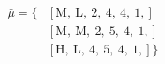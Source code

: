 \begin{equation}
\nonumber
\begin{aligned}
\bar{\mu} = \{  & \left[\text{M}, \ \text{L}, \ \text{2}, \ \text{4}, \ \text{4}, \ \text{1}, \right] \\  & \left[\text{M}, \ \text{M}, \ \text{2}, \ \text{5}, \ \text{4}, \ \text{1}, \right] \\  & \left[\text{H}, \ \text{L}, \ \text{4}, \ \text{5}, \ \text{4}, \ \text{1}, \right] \} \\ 
\end{aligned}
\end{equation} \\ 